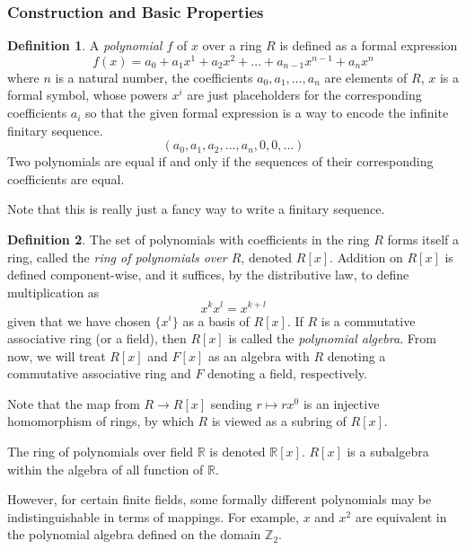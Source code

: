 \documentclass{article}
\theoremstyle{remark}
\theoremstyle{definition}
\newtheorem{definition}{Definition}[section]
\begin{document}
\subsubsection{Construction and Basic Properties}
\begin{definition}
A \textit{polynomial $f$} of $x$ over a ring $R$ is defined as a formal expression 
\begin{equation}
    f(x) = a_0 + a_1 x^1 + a_2 x^2 + ...  + a_{n-1} x^{n-1} + a_n x^n
\end{equation}
where $n$ is a natural number, the coefficients $a_0, a_1, ..., a_n$ are elements of $R$, $x$ is a formal symbol, whose powers $x^i$ are just placeholders for the corresponding coefficients $a_i$ so that the given formal expression is a way to encode the infinite finitary sequence. 
\begin{equation}
    (a_0, a_1, a_2, ..., a_n, 0, 0, ...)
\end{equation}
Two polynomials are equal if and only if the sequences of their corresponding coefficients are equal.
\end{definition}

Note that this is really just a fancy way to write a finitary sequence. 

\begin{definition}
The set of polynomials with coefficients in the ring $R$ forms itself a ring, called the \textit{ring of polynomials over $R$}, denoted $R[x]$. Addition on $R[x]$ is defined component-wise, and it suffices, by the distributive law, to define multiplication as
\[x^k x^l = x^{k + l}\]
given that we have chosen $\{x^i\}$ as a basis of $R[x]$. If $R$ is a commutative associative ring (or a field), then $R[x]$ is called the \textit{polynomial algebra}. From now, we will treat $R[x]$ and $F[x]$ as an algebra with $R$ denoting a commutative associative ring and $F$ denoting a field, respectively. 
\end{definition}

Note that the map from $R \longrightarrow R[x]$ sending $r \mapsto r x^0$ is an injective homomorphism of rings, by which $R$ is viewed as a subring of $R[x]$. 

The ring of polynomials over field $\mathbb{R}$ is denoted $\mathbb{R}[x]$. $R[x]$ is a subalgebra within the algebra of all function of $\mathbb{R}$. 

However, for certain finite fields, some formally different polynomials may be indistinguishable in terms of mappings. For example, $x$ and $x^2$ are equivalent in the polynomial algebra defined on the domain $\mathbb{Z}_2$.
\end{document}

